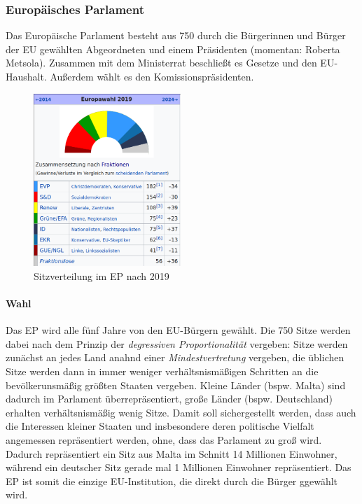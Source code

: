 \documentclass{article}
\begin{document}
	\subsubsection{Europäisches Parlament}
	Das Europäische Parlament besteht aus 750 durch die Bürgerinnen und Bürger der EU gewählten Abgeordneten und einem Präsidenten (momentan: Roberta Metsola). Zusammen mit dem Ministerrat beschließt es Gesetze und den EU-Haushalt. Außerdem wählt es den Komissionspräsidenten.

	\begin{figure}
		\centering
  		\includegraphics[width=15em]{eu_ep_2019.png}
  		\caption{Sitzverteilung im EP nach 2019}
  		\label{fig:eu_2019}
	\end{figure}

	\paragraph{Wahl}
	Das EP wird alle fünf Jahre von den EU-Bürgern gewählt. Die 750 Sitze werden dabei nach dem Prinzip der \textit{degressiven Proportionalität} vergeben: Sitze werden zunächst an jedes Land anahnd einer \textit{Mindestvertretung} vergeben, die üblichen Sitze werden dann in immer weniger verhältsnismäßigen Schritten an die bevölkerunsmäßig größten Staaten vergeben. Kleine Länder (bspw. Malta) sind dadurch im Parlament überrepräsentiert, große Länder (bspw. Deutschland) erhalten verhältsnismäßig wenig Sitze. Damit soll sichergestellt werden, dass auch die Interessen kleiner Staaten und insbesondere deren politische Vielfalt angemessen repräsentiert werden, ohne, dass das Parlament zu groß wird. Dadurch repräsentiert ein Sitz aus Malta im Schnitt 14 Millionen Einwohner, während ein deutscher Sitz gerade mal 1 Millionen Einwohner repräsentiert. Das EP ist somit die einzige EU-Institution, die direkt durch die Bürger ggewählt wird.
\end{document}
